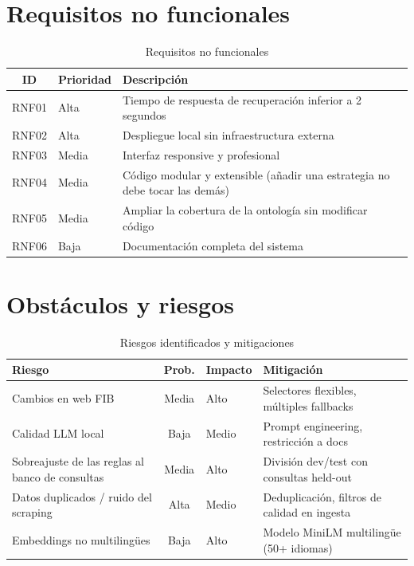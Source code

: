 \documentclass[12pt, a4paper, twoside]{report}
\begin{document}
\section{Requisitos no funcionales}

\begin{table}[H]
\centering
\caption{Requisitos no funcionales}
\label{tab:req-no-funcionales}
\begin{tabularx}{\textwidth}{clX}
\toprule
\textbf{ID} & \textbf{Prioridad} & \textbf{Descripci\'on} \\
\midrule
RNF01 & Alta & Tiempo de respuesta de recuperaci\'on inferior a 2 segundos \\
RNF02 & Alta & Despliegue local sin infraestructura externa \\
RNF03 & Media & Interfaz responsive y profesional \\
RNF04 & Media & C\'odigo modular y extensible (a\~nadir una estrategia no debe tocar las dem\'as) \\
RNF05 & Media & Ampliar la cobertura de la ontolog\'ia sin modificar c\'odigo \\
RNF06 & Baja & Documentaci\'on completa del sistema \\
\bottomrule
\end{tabularx}
\end{table}

\section{Obst\'aculos y riesgos}

\begin{table}[H]
\centering
\caption{Riesgos identificados y mitigaciones}
\label{tab:riesgos}
\begin{tabularx}{\textwidth}{lclX}
\toprule
\textbf{Riesgo} & \textbf{Prob.} & \textbf{Impacto} & \textbf{Mitigaci\'on} \\
\midrule
Cambios en web FIB & Media & Alto & Selectores flexibles, m\'ultiples fallbacks \\
Calidad LLM local & Baja & Medio & Prompt engineering, restricci\'on a docs \\
Sobreajuste de las reglas al banco de consultas & Media & Alto & Divisi\'on dev/test con consultas held-out \\
Datos duplicados / ruido del scraping & Alta & Medio & Deduplicaci\'on, filtros de calidad en ingesta \\
Embeddings no multiling\"ues & Baja & Alto & Modelo MiniLM multiling\"ue (50+ idiomas) \\
\bottomrule
\end{tabularx}
\end{table}
\end{document}
